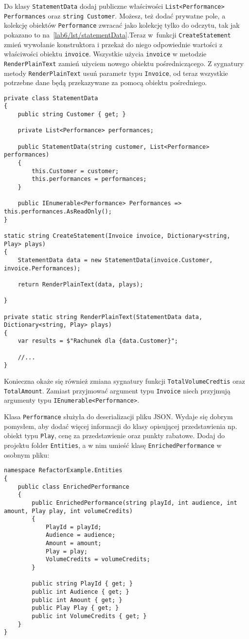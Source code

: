Do klasy \texttt{StatementData} dodaj publiczne właściwości \texttt{List<Performance> Performances} oraz \texttt{string Customer}. Możesz, też dodać prywatne pole, a kolekcję obiektów \texttt{Performance} zwracać jako kolekcję tylko do odczytu, tak jak pokazano to na~\ref{lab6/lst/statementData}.Teraz w~funkcji \texttt{CreateStatement} zmień wywołanie konstruktora i przekaż do niego odpowiednie wartości z właściwości obiektu \texttt{invoice}. Wszystkie użycia \texttt{invoice} w metodzie \texttt{RenderPlainText} zamień użyciem nowego obiektu pośredniczącego. Z sygnatury metody \texttt{RenderPlainText} usuń parametr typu \texttt{Invoice}, od teraz wszystkie potrzebne dane będą przekazywane za pomocą obiektu pośredniego.
\begin{lstlisting}[label=lab6/lst/statementData]
private class StatementData
{
	public string Customer { get; }
	
	private List<Performance> performances;
	
	public StatementData(string customer, List<Performance> performances)
	{
		this.Customer = customer;
		this.performances = performances;
	}
	
	public IEnumerable<Performance> Performances => this.performances.AsReadOnly();
}

static string CreateStatement(Invoice invoice, Dictionary<string, Play> plays)
{
	StatementData data = new StatementData(invoice.Customer, invoice.Performances);
	
	return RenderPlainText(data, plays);
	
}

private static string RenderPlainText(StatementData data, Dictionary<string, Play> plays)
{
	var results = $"Rachunek dla {data.Customer}";
	
	//...
}
\end{lstlisting}
Konieczna okaże się również zmiana sygnatury funkcji \texttt{TotalVolumeCredtis} oraz \texttt{TotalAmount}. Zamiast przyjmować argument typu \texttt{Invoice} niech przyjmują argumenty typu \texttt{IEnumerable<Performance>}.


Klasa \texttt{Performance} służyła do deserializacji pliku JSON. Wydaje się dobrym pomysłem, aby dodać więcej informacji do klasy opisującej przedstawienia np. obiekt typu \texttt{Play}, cenę za przedstawienie oraz punkty rabatowe. Dodaj do projektu folder \texttt{Entities}, a w nim umieść klasę \texttt{EnrichedPerformance} w osobnym pliku:
\begin{lstlisting}
namespace RefactorExample.Entities
{
	public class EnrichedPerformance
	{
		public EnrichedPerformance(string playId, int audience, int amount, Play play, int volumeCredits)
		{
			PlayId = playId;
			Audience = audience;
			Amount = amount;
			Play = play;
			VolumeCredits = volumeCredits;
		}
		
		public string PlayId { get; }	
		public int Audience { get; }	
		public int Amount { get; }
		public Play Play { get; }
		public int VolumeCredits { get; }
	}
}
\end{lstlisting}

